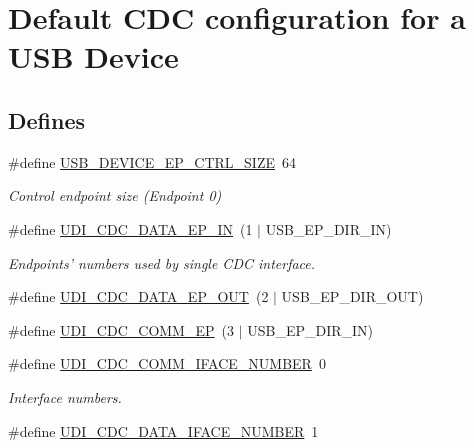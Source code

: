 \hypertarget{group__udi__cdc__group__conf}{
\section{\-Default \-C\-D\-C configuration for a \-U\-S\-B \-Device}
\label{group__udi__cdc__group__conf}
}
\subsection*{\-Defines}
\begin{DoxyCompactItemize}
\item 
\#define \hyperlink{group__udi__cdc__group__conf_ga67d99007f1886e516e6705e19c38b541}{\-U\-S\-B\-\_\-\-D\-E\-V\-I\-C\-E\-\_\-\-E\-P\-\_\-\-C\-T\-R\-L\-\_\-\-S\-I\-Z\-E}~64
\begin{DoxyCompactList}\small\item\em \-Control endpoint size (\-Endpoint 0) \end{DoxyCompactList}\item 
\#define \hyperlink{group__udi__cdc__group__conf_ga7ff6a7c82fc57177ccf13fa6d265371b}{\-U\-D\-I\-\_\-\-C\-D\-C\-\_\-\-D\-A\-T\-A\-\_\-\-E\-P\-\_\-\-I\-N}~(1 $|$ \-U\-S\-B\-\_\-\-E\-P\-\_\-\-D\-I\-R\-\_\-\-I\-N)
\begin{DoxyCompactList}\small\item\em \-Endpoints' numbers used by single \-C\-D\-C interface. \end{DoxyCompactList}\item 
\#define \hyperlink{group__udi__cdc__group__conf_gab4fa2fb6e6858512f9218a9417adb9b5}{\-U\-D\-I\-\_\-\-C\-D\-C\-\_\-\-D\-A\-T\-A\-\_\-\-E\-P\-\_\-\-O\-U\-T}~(2 $|$ \-U\-S\-B\-\_\-\-E\-P\-\_\-\-D\-I\-R\-\_\-\-O\-U\-T)
\item 
\#define \hyperlink{group__udi__cdc__group__conf_ga1b00f262b4976660ba23413581ee149f}{\-U\-D\-I\-\_\-\-C\-D\-C\-\_\-\-C\-O\-M\-M\-\_\-\-E\-P}~(3 $|$ \-U\-S\-B\-\_\-\-E\-P\-\_\-\-D\-I\-R\-\_\-\-I\-N)
\item 
\#define \hyperlink{group__udi__cdc__group__conf_ga003b73c73417cdaaea1a310aa2441c7b}{\-U\-D\-I\-\_\-\-C\-D\-C\-\_\-\-C\-O\-M\-M\-\_\-\-I\-F\-A\-C\-E\-\_\-\-N\-U\-M\-B\-E\-R}~0
\begin{DoxyCompactList}\small\item\em \-Interface numbers. \end{DoxyCompactList}\item 
\#define \hyperlink{group__udi__cdc__group__conf_ga4c16d6b2299e5d692ea818142da68dcb}{\-U\-D\-I\-\_\-\-C\-D\-C\-\_\-\-D\-A\-T\-A\-\_\-\-I\-F\-A\-C\-E\-\_\-\-N\-U\-M\-B\-E\-R}~1
\end{DoxyCompactItemize}
